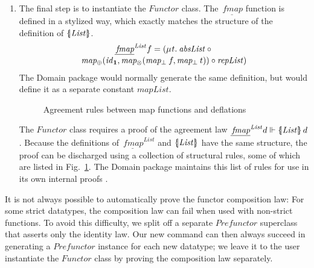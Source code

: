 \documentclass{sigplanconf}
\newcommand{\D}{\ensuremath{\mathcal{D}}}
\newcommand{\univ}[1]{\ensuremath{\underline{#1}}}
\newcommand{\REP}[1]{\ensuremath{\llbracket#1\rrbracket}}
\newcommand{\symlbrace}{\mathopen{\lbrace\mkern-4.5mu\mid}}
\newcommand{\symrbrace}{\mathclose{\mid\mkern-4.5mu\rbrace}}
\newcommand{\TC}[1]{\ensuremath{\symlbrace#1\symrbrace}}
\newcommand{\hsone}{\mathbf{1}}
\newcommand{\hair}{\mskip1mu}
\newcommand{\hsc}[1]{\ensuremath{\mathit{#1}}}
\newcommand{\hsid}{\hsc{id}}
\newcommand{\hscoerce}{\hsc{coerce}}
\newcommand{\fmap}{\,\hsc{fmap}} %
\newcommand{\fmapU}{\univ{\fmap}}
\newcommand{\mapLift}{\hsc{map_\bot}}
\newcommand{\mapSum}{\hsc{map_\oplus}}
\newcommand{\mapProd}{\hsc{map_\otimes}}
\newcommand{\tA}{\alpha}
\newcommand{\tB}{\beta}
\newcommand{\tT}{\tau}
\newcommand{\isodefl}{\Vdash}
\theoremstyle{definition}
\begin{document}
\begin{enumerate}
\item

The final step is to instantiate the \hsc{Functor} class. The $\fmapU$ function is defined in a stylized way, which exactly matches the structure of the definition of $\TC{\hsc{List}}$.
%
\begin{multline}
\fmapU^\hsc{List}f = (\mu\hair{t}.\:\hsc{absList} \circ{} \\[-\jot]
\mapSum(\hsid_\hsone, \mapProd(\mapLift\:f, \mapLift\:t)) \circ \hsc{repList})
\end{multline}
%
The Domain package would normally generate the same definition, but would define it as a separate constant \hsc{mapList}.

\begin{figure}
\caption{Agreement rules between map functions and deflations}
\label{fig:agreement}
\end{figure}

The \hsc{Functor} class requires a proof of the agreement law $\fmapU^\hsc{List}d \isodefl \TC{\hsc{List}}\,d$. Because the definitions of $\fmapU^\hsc{List}$ and $\TC{\hsc{List}}$ have the same structure, the proof can be discharged using a collection of structural rules, some of which are listed in Fig.~\ref{fig:agreement}. The Domain package maintains this list of rules for use in its own internal proofs \cite[\S6.6]{holcf11}.

\end{enumerate}

It is not always possible to automatically prove the functor composition law: For some strict datatypes, the composition law can fail when used with non-strict functions. To avoid this difficulty, we split off a separate \hsc{Prefunctor} superclass that asserts only the identity law. Our new command can then always succeed in generating a \hsc{Prefunctor} instance for each new datatype; we leave it to the user instantiate the \hsc{Functor} class by proving the composition law separately.
\end{document}
